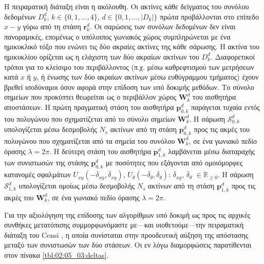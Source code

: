Η πειραματική διάταξη είναι η ακόλουθη. Οι ακτίνες κάθε δείγματος του συνόλου
δεδομένων $D_k^d$, $k \in \{0,1,\dots,4\}$, $d \in \{0,1,\dots,|D_k|\}$ πρώτα
προβάλλονται στο επίπεδο $x-y$ γύρω από τη στάση $\bm{r}_k^d$. Οι σαρώσεις των
συνόλων δεδομένων δεν είναι πανοραμικές, επομένως ο υπόλοιπος γωνιακός χώρος
συμπληρώνεται με ένα ημικυκλικό τόξο που ενώνει τις δύο ακραίες ακτίνες της
κάθε σάρωσης. Η ακτίνα του ημικυκλίου ορίζεται ως η ελάχιστη των δύο ακραίων
ακτίνων του $D_k^d$. Διαφορετικοί τρόποι για το κλείσιμο του περιβάλλοντος
(π.χ.  μέσω καθρεφτισμού των μετρήσεων κατά $x$ ή $y$, ή ένωσης των δύο ακραίων
ακτίνων μέσω ευθύγραμμου τμήματος) έχουν βρεθεί ισοδύναμοι όσον αφορά στην
επίδοση των υπό δοκιμής μεθόδων. Το σύνολο σημείων που προκύπτει θεωρείται ως ο
περιβάλλον χώρος $\bm{W}_k^d$ του αισθητήρα αποστάσεων. Η πρώτη πραγματική
στάση του αισθητήρα $\bm{p}_{0,k}^d$ παράγεται τυχαία εντός του πολυγώνου που
σχηματίζεται από το σύνολο σημείων $\bm{W}_k^d$. Η σάρωση $\mathcal{S}_{0,k}^d$
υπολογίζεται μέσω δεσμοβολής $N_s$ ακτίνων από τη στάση $\bm{p}_{0,k}^d$ προς
τις ακμές του πολυγώνου που σχηματίζεται από τα σημεία του συνόλου
$\bm{W}_k^d$, σε ένα γωνιακό πεδίο όρασης $\lambda = 2\pi$. Η δεύτερη στάση του
αισθητήρα $\bm{p}_{1,k}^d$ λαμβάνεται μέσω διαταραχής των συνιστωσών της στάσης
$\bm{p}^d_{0,k}$ με ποσότητες που εξάγονται από ομοιόμορφες κατανομές σφαλμάτων
$U_{xy}(-\overline{\delta}_{xy}, \overline{\delta}_{xy})$,
$U_{\theta}(-\overline{\delta}_{\theta}, \overline{\delta}_{\theta})$:
$\overline{\delta}_{xy}$, $\overline{\delta}_\theta$ $\in \mathbb{R}_{\geq 0}$.
Η σάρωση $\mathcal{S}_{1,k}^d$ υπολογίζεται ομοίως μέσω δεσμοβολής $N_s$
ακτίνων από τη στάση $\bm{p}_{1,k}^d$ προς τις ακμές του $\bm{W}_k^d$, σε ένα
γωνιακό πεδίο όρασης $\lambda = 2\pi$.

Για την αξιολόγηση της επίδοσης των αλγορίθμων υπό δοκιμή ως προς τις αρχικές
συνθήκες μετατόπισης συμμορφωνόμαστε με---και υιοθετούμε---την πειραματική
διάταξη του Censi \cite{Censi2008a}, η οποία συνίσταται στην προοδευτική αύξηση
της απόστασης μεταξύ των συνιστωσών των δύο στάσεων. Οι εν λόγω διαμορφώσεις
παρατίθενται στον πίνακα \ref{tbl:02:05_03:deltas}.

